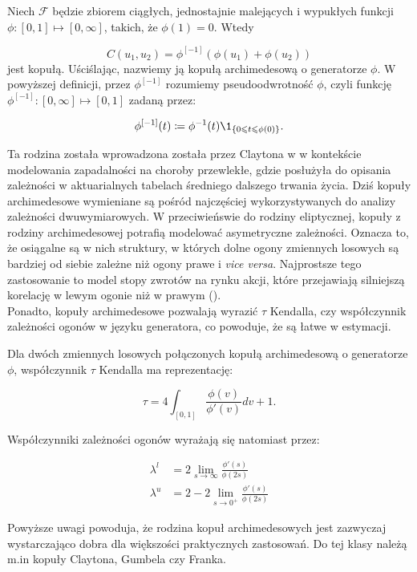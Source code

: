 \begin{df}
		Niech $\mathcal{F}$ będzie zbiorem ciągłych, jednostajnie malejących i wypukłych funkcji $\phi \colon [0,1] \mapsto [0, \infty]$, takich, że $\phi(1) = 0$. Wtedy
		
		$$ C(u_1, u_2) = \phi^{[-1]}(\phi(u_1)+\phi(u_2))$$
		jest kopułą. Uściślając, nazwiemy ją kopułą archimedesową o generatorze $\phi$. W powyższej definicji, przez $\phi^{[-1]}$ rozumiemy pseudoodwrotność $\phi$, czyli funkcję $\phi^{[-1]}\colon [0, \infty] \mapsto [0, 1]$ zadaną przez:
		
		$$ \phi^{[-1]}(t) \coloneqq \phi^{-1}(t) \1_{\{0\leqslant t \leqslant \phi(0)\}}. $$
\end{df}

Ta rodzina została wprowadzona została przez Claytona w \cite{Clayton1972} w kontekście modelowania zapadalności na choroby przewlekłe, gdzie posłużyła do opisania zależności w aktuarialnych tabelach średniego dalszego trwania życia. Dziś kopuły archimedesowe wymieniane są pośród najczęściej wykorzystywanych do analizy zależności dwuwymiarowych. W przeciwieńswie do rodziny eliptycznej, kopuły z rodziny archimedesowej potrafią modelować asymetryczne zależności. Oznacza to, że osiągalne są w nich struktury, w których dolne ogony zmiennych losowych są bardziej od siebie zależne niż ogony prawe i \emph{vice versa}. Najprostsze tego zastosowanie to model stopy zwrotów na rynku akcji, które przejawiają silniejszą korelację w lewym ogonie niż w prawym (\cite{AssymetricEquityDependency}). \\
Ponadto, kopuły archimedesowe pozwalają wyrazić $\tau$ Kendalla, czy współczynnik zależności ogonów w języku generatora, co powoduje, że są łatwe w estymacji.

\begin{prop}
	Dla dwóch zmiennych losowych połączonych kopułą archimedesową o generatorze $\phi$, współczynnik $\tau$ Kendalla ma reprezentację:
	
	$$ \tau = 4\int_{[0, 1]}\frac{\phi(v)}{\phi'(v)}dv + 1.$$
	
	Współczynniki zależności ogonów wyrażają się natomiast przez:
	
	\begin{equation}
		\begin{split}
		\lambda^{l}&=2\lim\limits_{s\to\infty}\frac{\phi'(s)}{\phi(2s)} \\
		\lambda^{u}&=2-2\lim\limits_{s\to0^{+}}\frac{\phi'(s)}{\phi(2s)}
		\end{split}
	\end{equation}
\end{prop}
Powyższe uwagi powoduja, że rodzina kopuł archimedesowych jest zazwyczaj wystarczająco dobra dla większości praktycznych zastosowań. Do tej klasy należą m.in kopuły Claytona, Gumbela czy Franka.

